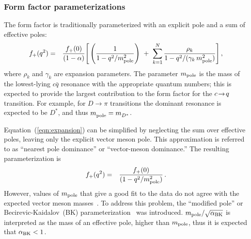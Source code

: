 
\subsubsection{Form factor parameterizations} 

The form factor is traditionally parameterized with an explicit pole 
and a sum of effective poles:
\begin{eqnarray}
f_+(q^2) & = & \frac{f_+(0)}{(1-\alpha)}\Bigg [
\left(\frac{1}{1- q^2/m^2_{\rm pole}}\right)\ +\ 
\sum_{k=1}^{N}\frac{\rho_k}{1- q^2/(\gamma_k\,m^2_{\rm pole})}\Bigg ]\,,
\label{eqn:expansion}
\end{eqnarray}
where $\rho_k$ and $\gamma_k$ are expansion parameters. The parameter
$m_{{\rm pole}}$ is the mass of the lowest-lying $c\bar{q}$ resonance
with the appropriate quantum numbers; this is expected to provide the
largest contribution to the form factor for the $c\!\rightarrow\! q$ transition.  
For example, for $D\to\pi$ transitions the dominant resonance is
expected to be $D^*$, and thus $m^{}_{\rm pole}=m^{}_{D^*}$.


Equation~(\ref{eqn:expansion}) can be simplified by neglecting the 
sum over effective poles, leaving only the explicit vector meson pole. 
This approximation is referred to as ``nearest pole dominance'' or 
``vector-meson dominance.''  The resulting parameterization is
\begin{eqnarray}
  f_+(q^2) & = & \frac{f_+(0)}{(1-q^2/m^2_{\rm pole})}\,. 
\label{SimplePole}
\end{eqnarray}
However, values of $m_{{\rm pole}}$ that give a good fit to the data 
do not agree with the expected vector meson masses~\cite{Hill:2006ub}. 
To address this problem, the ``modified pole'' or Becirevic-Kaidalov~(BK) 
parameterization~\cite{Becirevic:1999kt} was introduced.
$m_{\rm pole} /\sqrt{\alpha_{\rm BK}}$
is interpreted as the mass of an effective pole, higher than $m_{\rm pole}$, thus it is expected that $\alpha_{\rm BK}<1$.

 

